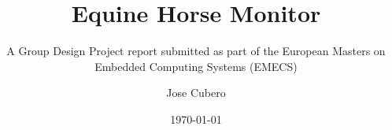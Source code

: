 
\newcommand{\mytitle}{Equine Horse Monitor}
\newcommand{\mysubtitle}{A Group Design Project report submitted as part of the European Masters on Embedded Computing Systems (EMECS)}
\newcommand{\myauthor}{Jose Cubero}
\newcommand{\myauthori}{Merve Oksar}
\newcommand{\myauthorii}{Konke Radlow}
\newcommand{\myauthoriii}{Michail Sidorov}
\newcommand{\myauthoriv}{Yaman Umuroglu}
\newcommand{\type}{GDP Project 2012/2013}
\newcommand{\fieldOfStudy}{EMECS}
\newcommand{\faculty}{ECS}
\newcommand{\studentid}{xxxxxx}
\newcommand{\professor}{Dr. Peter Reid Wilson}
\newcommand{\professori}{Iain McNelly}
\newcommand{\location}{Southampton}
\newcommand{\semester}{Winter 2012}

\title{\mytitle}
\subtitle{\mysubtitle}
\author{\myauthor}
\date{\today}



